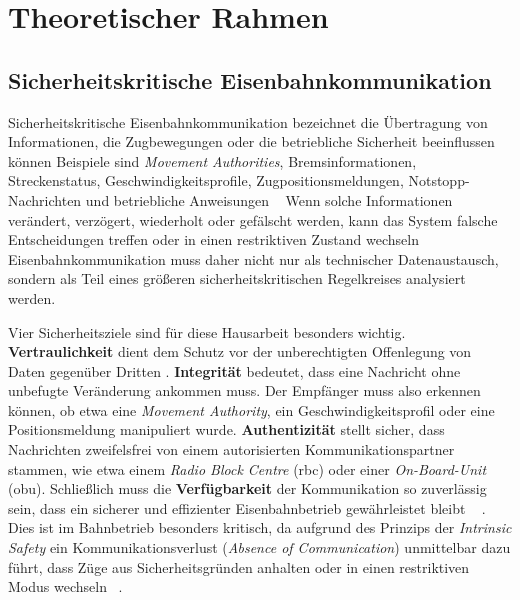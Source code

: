 \documentclass[runningheads]{res/llncs}
\begin{document}
\section{Theoretischer Rahmen}
\label{sec:Theoretischer_Rahmen}

\subsection{Sicherheitskritische Eisenbahnkommunikation}
\label{sec:Sicherheitskritische_Eisenbahnkommunikation}

Sicherheitskritische Eisenbahnkommunikation bezeichnet die Übertragung von Informationen, die Zugbewegungen oder die betriebliche Sicherheit beeinflussen können 
Beispiele sind \textit{Movement Authorities}, Bremsinformationen, Streckenstatus, Geschwindigkeitsprofile, Zugpositionsmeldungen, Notstopp-Nachrichten und betriebliche Anweisungen 
\unskip~\parencite[S. 120--121]{trinckaufETCS2024}
Wenn solche Informationen verändert, verzögert, wiederholt oder gefälscht werden, kann das System falsche Entscheidungen treffen oder in einen restriktiven Zustand wechseln 
\unskip~\parencite[S. 17]{iwamotoTrain2024}
Eisenbahnkommunikation muss daher nicht nur als technischer Datenaustausch, sondern als Teil eines größeren sicherheitskritischen Regelkreises analysiert werden. 

Vier Sicherheitsziele sind für diese Hausarbeit besonders wichtig. \textbf{Vertraulichkeit} dient dem Schutz vor der unberechtigten Offenlegung von Daten gegenüber Dritten 
. \textbf{Integrität} bedeutet, dass eine Nachricht ohne unbefugte Veränderung ankommen muss. Der Empfänger muss also erkennen können, ob etwa eine \textit{Movement Authority}, ein Geschwindigkeitsprofil oder eine Positionsmeldung manipuliert wurde.
\textbf{Authentizität} stellt sicher, dass Nachrichten zweifelsfrei von einem autorisierten Kommunikationspartner stammen, wie etwa einem \textit{Radio Block Centre} (\gls{rbc}) oder einer \textit{On-Board-Unit} (\gls{obu}).
Schließlich muss die \textbf{Verfügbarkeit} der Kommunikation so zuverlässig sein, dass ein sicherer und effizienter Eisenbahnbetrieb gewährleistet bleibt 
\unskip~\parencite[S. 207]{trinckaufETCS2024}
. Dies ist im Bahnbetrieb besonders kritisch, da aufgrund des Prinzips der \textit{Intrinsic Safety} ein Kommunikationsverlust (\textit{Absence of Communication}) unmittelbar dazu führt, dass Züge aus Sicherheitsgründen anhalten oder in einen restriktiven Modus wechseln 
\unskip~\parencite[S. 56]{gaggeroSurvey2024}.
\end{document}
